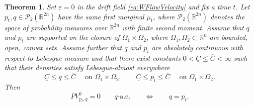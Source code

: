 \documentclass[oneside,11pt]{article}
\newtheorem{theorem}{Theorem}
\theoremstyle{remark}
\newcommand{\R}{\mathbb{R}}
\begin{document}
\begin{theorem}
\label{thm:ProjectedEquilibriumW2}
Set $\varepsilon = 0$ in the drift field \eqref{eq:WFlowVelocity} and fix a time $t$. Let $p_t,q\in\mathcal P_2(\R^{2n})$ have the same first marginal $\mu_t$, where $\mathcal{P}_2(\R^{2n})$ denotes the space of probability measures over $\R^{2n}$ with finite second moment. 
Assume that $q$ and $p_t$ are supported on the closure of $\Omega_1\times\Omega_2$, where $\Omega_1, \Omega_2 \subset \R^{n}$ are bounded, open, convex sets. Assume further that $q$ and $p_t$ are absolutely continuous with respect to Lebesgue measure and that there exist constants $0<\underline{C}\le \overline{C}<\infty$ such that their densities satisfy Lebesgue-almost everywhere
\begin{equation}\label{eq:BoundedDensities}
    \underline{C}\le q\le \overline{C} \quad\text{ on }\Omega_1\times\Omega_2, \qquad \underline{C}\le p_t\le \overline{C} \quad\text{ on }\Omega_1\times\Omega_2.
\end{equation}
Then
\begin{equation}
\label{eq:ProjectedEquilibriumW2}
    PV_{p_t,q}^{0}=0
    \qquad q\text{-a.e.}
    \qquad\Longleftrightarrow\qquad
    q=p_t.
\end{equation}
\end{theorem}
\end{document}
